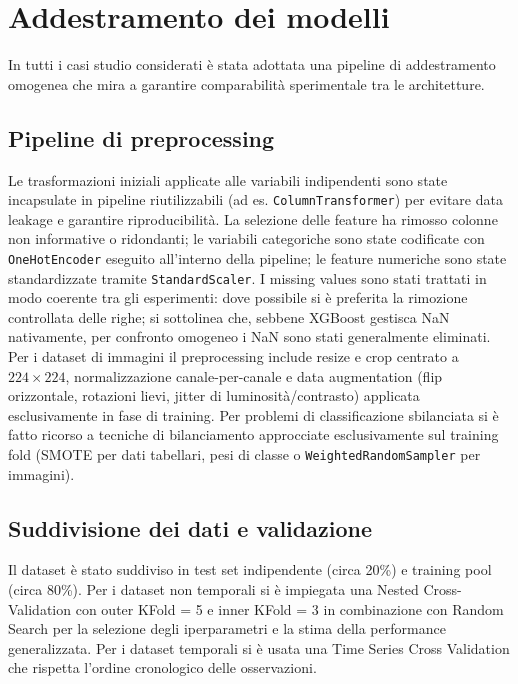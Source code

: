 \documentclass[a4paper,12pt]{report}
\begin{document}
	\section{Addestramento dei modelli}
	
	In tutti i casi studio considerati è stata adottata una pipeline di addestramento omogenea che mira a garantire comparabilità sperimentale tra le architetture.
	
	\subsection{Pipeline di preprocessing}
	Le trasformazioni iniziali applicate alle variabili indipendenti sono state incapsulate in pipeline riutilizzabili (ad es. \texttt{ColumnTransformer}) per evitare data leakage e garantire riproducibilità. La selezione delle feature ha rimosso colonne non informative o ridondanti; le variabili categoriche sono state codificate con \texttt{OneHotEncoder} eseguito all'interno della pipeline; le feature numeriche sono state standardizzate tramite \texttt{StandardScaler}. I missing values sono stati trattati in modo coerente tra gli esperimenti: dove possibile si è preferita la rimozione controllata delle righe; si sottolinea che, sebbene XGBoost gestisca NaN nativamente, per confronto omogeneo i NaN sono stati generalmente eliminati. Per i dataset di immagini il preprocessing include resize e crop centrato a $224\times224$, normalizzazione canale-per-canale e data augmentation (flip orizzontale, rotazioni lievi, jitter di luminosità/contrasto) applicata esclusivamente in fase di training. Per problemi di classificazione sbilanciata si è fatto ricorso a tecniche di bilanciamento approcciate esclusivamente sul training fold (SMOTE per dati tabellari, pesi di classe o \texttt{WeightedRandomSampler} per immagini).
	
	\subsection{Suddivisione dei dati e validazione}
	Il dataset è stato suddiviso in test set indipendente (circa 20\%) e training pool (circa 80\%). Per i dataset non temporali si è impiegata una Nested Cross-Validation con outer KFold = 5 e inner KFold = 3 in combinazione con Random Search per la selezione degli iperparametri e la stima della performance generalizzata. Per i dataset temporali si è usata una Time Series Cross Validation che rispetta l'ordine cronologico delle osservazioni.
	
\end{document}
